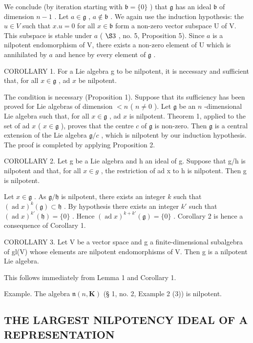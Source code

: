 We conclude (by iteration starting with \(\mathfrak{b} = \{0\}\) ) that \(\mathfrak{g}\) has an ideal \(\mathfrak{b}\) of dimension \(n - 1\) . Let \(a \in \mathfrak{g}\) , \(a \notin \mathfrak{b}\) . We again use the induction hypothesis: the \(u \in V\) such that \(x.u = 0\) for all \(x \in \mathfrak{b}\) form a non-zero vector subspace U of V. This subspace is stable under \(a\) ( \(\S 3\) , no. 5, Proposition 5). Since \(a\) is a nilpotent endomorphism of V, there exists a non-zero element of U which is annihilated by \(a\) and hence by every element of \(\mathfrak{g}\) .

COROLLARY 1. For a Lie algebra g to be nilpotent, it is necessary and sufficient that, for all \(x \in \mathfrak{g}\) , ad \(x\) be nilpotent.

The condition is necessary (Proposition 1). Suppose that its sufficiency has been proved for Lie algebras of dimension \(< n\) ( \(n \neq 0\) ). Let \(\mathfrak{g}\) be an \(n\) -dimensional Lie algebra such that, for all \(x \in \mathfrak{g}\) , ad \(x\) is nilpotent. Theorem 1, applied to the set of ad \(x\) ( \(x \in \mathfrak{g}\) ), proves that the centre \(c\) of \(\mathfrak{g}\) is non-zero. Then \(\mathfrak{g}\) is a central extension of the Lie algebra \(\mathfrak{g}/c\) , which is nilpotent by our induction hypothesis. The proof is completed by applying Proposition 2.

COROLLARY 2. Let g be a Lie algebra and h an ideal of g. Suppose that g/h is nilpotent and that, for all \(x \in g\) , the restriction of ad x to h is nilpotent. Then g is nilpotent.

Let \(x \in \mathfrak{g}\) . As \(\mathfrak{g} / \mathfrak{h}\) is nilpotent, there exists an integer \(k\) such that \((\operatorname{ad} x)^k(\mathfrak{g}) \subset \mathfrak{h}\) . By hypothesis there exists an integer \(k'\) such that \((\operatorname{ad} x)^{k'}(\mathfrak{h}) = \{0\}\) . Hence \((\operatorname{ad} x)^{k + k'}(\mathfrak{g}) = \{0\}\) . Corollary 2 is hence a consequence of Corollary 1.

COROLLARY 3. Let V be a vector space and g a finite-dimensional subalgebra of gl(V) whose elements are nilpotent endomorphisms of V. Then g is a nilpotent Lie algebra.

This follows immediately from Lemma 1 and Corollary 1.

Example. The algebra \(\mathfrak{n}(n,\mathbf{K})\) (§ 1, no. 2, Example 2 (3)) is nilpotent.

\subsection{THE LARGEST NILPOTENCY IDEAL OF A REPRESENTATION}

